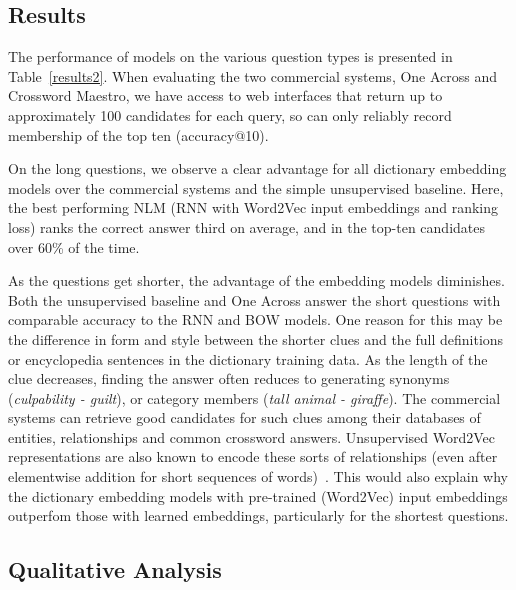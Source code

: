 \documentclass[11pt,letterpaper]{article}
\begin{document}
\subsection{Results}

The performance of models on the various question types is presented in Table~\ref{results2}. When evaluating the two commercial systems, One Across and Crossword Maestro, we have access to web interfaces that return up to approximately 100 candidates for each query, so can only reliably record membership of the top ten (accuracy@10).

On the long questions, we observe a clear advantage for all dictionary embedding models over the commercial systems and the simple unsupervised baseline. Here, the best performing NLM (RNN with Word2Vec input embeddings and ranking loss) ranks the correct answer third on average, and in the top-ten candidates over 60\% of the time.
	
As the questions get shorter, the advantage of the embedding models diminishes. Both the unsupervised baseline and One Across answer the short questions with comparable accuracy to the RNN and BOW models. One reason for this may be the difference in form and style between the shorter clues and the full definitions or encyclopedia sentences in the dictionary training data. As the length of the clue decreases, finding the answer often reduces to generating synonyms (\emph{culpability - guilt}), or category members (\emph{tall animal - giraffe}). The commercial systems can retrieve good candidates for such clues among their databases of entities, relationships and common crossword answers. Unsupervised Word2Vec representations are also  known to encode these sorts of relationships (even after elementwise addition for short sequences of words)~\cite{mikolov2013distributed}. This would also explain why the dictionary embedding models with pre-trained (Word2Vec) input embeddings outperfom those with learned embeddings, particularly for the shortest questions. 


\subsection{Qualitative Analysis}
\end{document}
